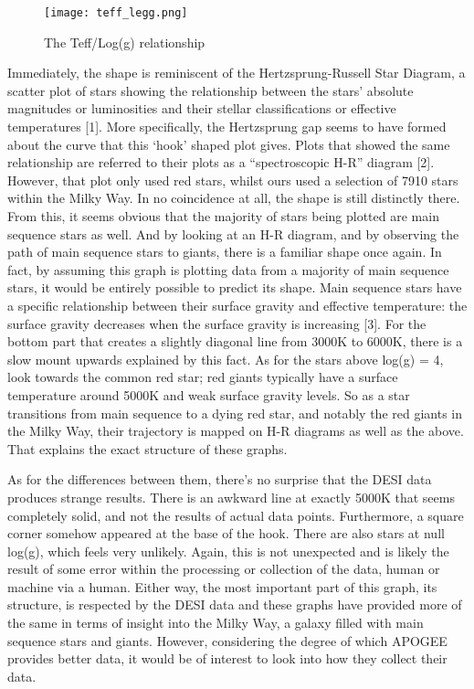 \documentclass{article}
\begin{document}
\begin{figure}[h!tbp]
    \centering
    \texttt{[image: teff\_legg.png]}
    \caption{The Teff/Log(g) relationship}
    \label{fig:3}
\end{figure}

\indent Immediately, the shape is reminiscent of the Hertzsprung-Russell Star Diagram, a scatter plot of stars showing the relationship between the stars' absolute magnitudes or luminosities and their stellar classifications or effective temperatures [1]. More specifically, the Hertzsprung gap seems to have formed about the curve that this ‘hook’ shaped plot gives. Plots that showed the same relationship are referred to their plots as a “spectroscopic H-R” diagram [2]. However, that plot only used red stars, whilst ours used a selection of 7910 stars within the Milky Way. In no coincidence at all, the shape is still distinctly there. From this, it seems obvious that the majority of stars being plotted are main sequence stars as well. And by looking at an H-R diagram, and by observing the path of main sequence stars to giants, there is a familiar shape once again. In fact, by assuming this graph is plotting data from a majority of main sequence stars, it would be entirely possible to predict its shape. Main sequence stars have a specific relationship between their surface gravity and effective temperature: the surface gravity decreases when the surface gravity is increasing [3]. For the bottom part that creates a slightly diagonal line from 3000K to 6000K, there is a slow mount upwards explained by this fact. As for the stars above log(g) = 4, look towards the common red star; red giants typically have a surface temperature around 5000K and weak surface gravity levels. So as a star transitions from main sequence to a dying red star, and notably the red giants in the Milky Way, their trajectory is mapped on H-R diagrams as well as the above. That explains the exact structure of these graphs.

\indent As for the differences between them, there’s no surprise that the DESI data produces strange results. There is an awkward line at exactly 5000K that seems completely solid, and not the results of actual data points. Furthermore, a square corner somehow appeared at the base of the hook. There are also stars at null log(g), which feels very unlikely. Again, this is not unexpected and is likely the result of some error within the processing or collection of the data, human or machine via a human. Either way, the most important part of this graph, its structure, is respected by the DESI data and these graphs have provided more of the same in terms of insight into the Milky Way, a galaxy filled with main sequence stars and giants. However, considering the degree of which APOGEE provides better data, it would be of interest to look into how they collect their data.\\
\end{document}
